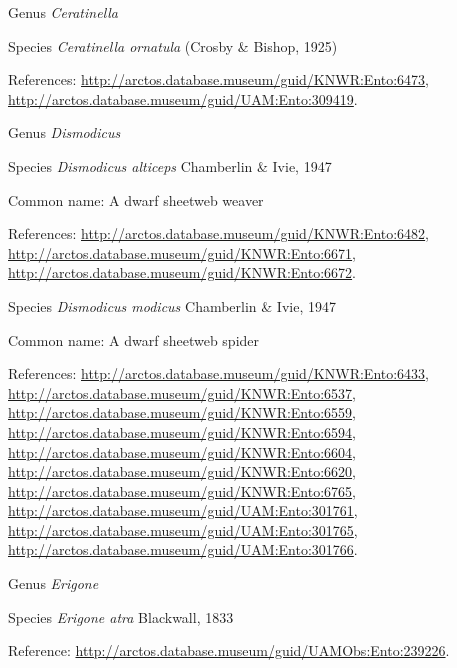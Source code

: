 \documentclass[9pt, article]{memoir}
\begin{document}
\begin{multicols}{2}
\vspace{6pt}\noindent\hspace{30pt}Genus \textit{Ceratinella}


\vspace{6pt}\noindent\hspace{36pt}Species \textit{Ceratinella ornatula} (Crosby \& Bishop, 1925)


References: 
\url{http://arctos.database.museum/guid/KNWR:Ento:6473}, 
\url{http://arctos.database.museum/guid/UAM:Ento:309419}.

\vspace{6pt}\noindent\hspace{30pt}Genus \textit{Dismodicus}


\vspace{6pt}\noindent\hspace{36pt}Species \textit{Dismodicus alticeps} Chamberlin \& Ivie, 1947


Common name: A dwarf sheetweb weaver

References: 
\url{http://arctos.database.museum/guid/KNWR:Ento:6482}, 
\url{http://arctos.database.museum/guid/KNWR:Ento:6671}, 
\url{http://arctos.database.museum/guid/KNWR:Ento:6672}.

\vspace{6pt}\noindent\hspace{36pt}Species \textit{Dismodicus modicus} Chamberlin \& Ivie, 1947


Common name: A dwarf sheetweb spider

References: 
\url{http://arctos.database.museum/guid/KNWR:Ento:6433}, 
\url{http://arctos.database.museum/guid/KNWR:Ento:6537}, 
\url{http://arctos.database.museum/guid/KNWR:Ento:6559}, 
\url{http://arctos.database.museum/guid/KNWR:Ento:6594}, 
\url{http://arctos.database.museum/guid/KNWR:Ento:6604}, 
\url{http://arctos.database.museum/guid/KNWR:Ento:6620}, 
\url{http://arctos.database.museum/guid/KNWR:Ento:6765}, 
\url{http://arctos.database.museum/guid/UAM:Ento:301761}, 
\url{http://arctos.database.museum/guid/UAM:Ento:301765}, 
\url{http://arctos.database.museum/guid/UAM:Ento:301766}.

\vspace{6pt}\noindent\hspace{30pt}Genus \textit{Erigone}


\vspace{6pt}\noindent\hspace{36pt}Species \textit{Erigone atra} Blackwall, 1833


Reference: 
\url{http://arctos.database.museum/guid/UAMObs:Ento:239226}.


\end{multicols}
\end{document}
